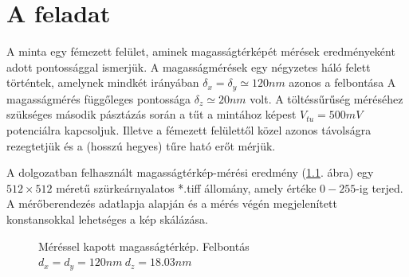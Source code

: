 \chapter{A feladat} \label{sec:feladat}
	A minta egy fémezett felület, aminek magasságtérképét mérések eredményeként 
	adott pontossággal ismerjük.
	A magasságmérések egy négyzetes háló felett történtek, amelynek mindkét irányában
	$\delta_x = \delta_y \simeq 120 nm$ azonos a felbontása
	A magasságmérés függőleges pontossága $\delta_z \simeq 20nm$ volt.
	A töltéssűrűség méréséhez szükséges második pásztázás során a tűt a mintához képest $V_{tu} = 500 mV$ potenciálra kapcsoljuk.
	Illetve a fémezett felülettől közel azonos távolságra rezegtetjük és a (hosszú hegyes) tűre ható erőt mérjük.
	
	\noindent A dolgozatban felhasznált magasságtérkép-mérési eredmény (\ref{fig:felulet}. ábra) egy
	$512\times512$ méretű szürkeárnyalatos *.tiff állomány, amely értéke $0-255$-ig terjed.
	A mérőberendezés adatlapja alapján és a mérés végén megjelenített konstansokkal lehetséges a kép skálázása.
	
	\begin{figure}[!h]
		\centering
		\hfil
		\caption{Méréssel kapott magasságtérkép. Felbontás $d_x=d_y=120nm \ d_z=18.03nm$}
		\label{fig:felulet}
	\end{figure}
	

